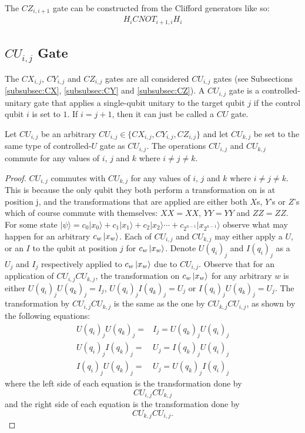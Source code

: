 The $\mathit{CZ}_{i,i+1}$ gate can be constructed from the Clifford generators like so:
\begin{align}
H_{i}\mathit{CNOT}_{i+1,i}H_{i}
\end{align}

\subsection{\texorpdfstring{$\mathit{CU}_{i,j}$}{ i,j} Gate}
\label{subsubsec:CU}
The $\mathit{CX}_{i,j}$, $\mathit{CY}_{i,j}$ and $\mathit{CZ}_{i,j}$ gates are all considered $\mathit{CU}_{i,j}$ gates (see Subsections \ref{subsubsec:CX}, \ref{subsubsec:CY} and \ref{subsubsec:CZ}). A $\mathit{CU}_{i,j}$ gate is a controlled-unitary gate that applies a single-qubit unitary to the target qubit $j$ if the control qubit $i$ is set to $1$. If $i = j + 1$, then it can just be called a $\mathit{CU}$ gate.

\begin{theorem}
\label{theorem:CUsCommute}
Let $\mathit{CU}_{i,j}$ be an arbitrary $\mathit{CU}_{i,j} \in \{\mathit{CX}_{i,j}, \mathit{CY}_{i,j}, \mathit{CZ}_{i,j}\}$ and let $\mathit{CU}_{k,j}$ be set to the same type of controlled-$U$ gate as $\mathit{CU}_{i,j}$. The operations $\mathit{CU}_{i,j}$ and $\mathit{CU}_{k,j}$ commute for any values of $i$, $j$ and $k$ where $i \neq j \neq k$.
\end{theorem}
\begin{proof}
$\mathit{CU}_{i,j}$ commutes with $\mathit{CU}_{k,j}$ for any values of $i$, $j$ and $k$ where $i \neq j \neq k$. This is because the only qubit they both perform a transformation on is at position j, and the transformations that are applied are either both $X$s, $Y$'s or $Z$'s which of course commute with themselves: $XX = XX$, $YY = YY$ and $ZZ = ZZ$. For some state $|\psi\rangle = c_0|x_0\rangle + c_1|x_1\rangle + c_2|x_2\rangle \cdots + c_{2^{n-1}}|x_{2^{n-1}}\rangle$ observe what may happen for an arbitrary $c_w\ket{x_w}$. Each of $\mathit{CU}_{i,j}$ and $\mathit{CU}_{k,j}$ may either apply a $U$, or an $I$ to the qubit at position $j$ for $c_w\ket{x_w}$. Denote $U(q_i)_j$ and $I(q_i)_j$ as a $U_j$ and $I_j$ respectively applied to $c_w\ket{x_w}$ due to $\mathit{CU}_{i,j}$. Observe that for an application of $\mathit{CU}_{i,j}\mathit{CU}_{k,j}$, the transformation on $c_w\ket{x_w}$ for any arbitrary $w$ is either $U(q_i)_j U(q_k)_j = I_j$, $U(q_i)_jI(q_k)_j = U_j$ or $I(q_i)_jU(q_k)_j = U_j$. The transformation by $\mathit{CU}_{i,j}\mathit{CU}_{k,j}$ is the same as the one by $\mathit{CU}_{k,j}\mathit{CU}_{i,j}$, as shown by the following equations:
\begin{align}
U(q_i)_j U(q_k)_j = &I_j = U(q_k)_j U(q_i)_j\\
U(q_i)_jI(q_k)_j = &U_j = I(q_k)_jU(q_i)_j\\
I(q_i)_jU(q_k)_j = &U_j = U(q_k)_jI(q_i)_j
\end{align}
where the left side of each equation is the transformation done by $$\mathit{CU}_{i,j}\mathit{CU}_{k,j}$$ and the right side of each equation is the transformation done by $$\mathit{CU}_{k,j}\mathit{CU}_{i,j}.$$
\end{proof}

